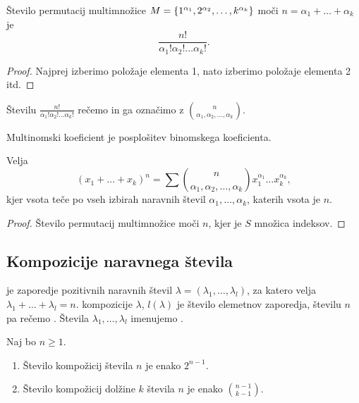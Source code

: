\begin{trditev}
    Število permutacij multimnožice $M=\left\{1^{\alpha_1}, 2^{\alpha_2}, \ldots, k^{\alpha_k}\right\}$ moči $n = \alpha_1 + \ldots + \alpha_k$ je 
    $$\frac{n!}{\alpha_1!\alpha_2!\ldots\alpha_k!}.$$
\end{trditev}

\begin{proof}
    Najprej izberimo položaje elementa 1, nato izberimo položaje elementa 2 itd.
\end{proof}

\begin{definicija}
    Številu $\frac{n!}{\alpha_1! \alpha_2! \ldots \alpha_k!}$ rečemo  in ga označimo z $\binom{n}{\alpha_1, \alpha_2, \ldots, \alpha_k}$.
\end{definicija}

\begin{opomba}
    Multinomski koeficient je posplošitev binomskega koeficienta.
\end{opomba}

\begin{trditev}
    Velja 
    $$(x_1 + \ldots + x_k)^n = \sum \binom{n}{\alpha_1, \alpha_2, \ldots, \alpha_k}x_1^{\alpha_1} \ldots x_k^{\alpha_k},$$
    kjer vsota teče po vseh izbirah naravnih števil $\alpha_1, \ldots, \alpha_k$, katerih vsota je $n$.
\end{trditev}

\begin{proof}
    Število permutacij multimnožice moči $n$, kjer je $S$ množica indeksov.
\end{proof}

\subsection{Kompozicije naravnega števila}
\begin{definicija}
     je zaporedje pozitivnih naravnih števil $\lambda = (\lambda_1, \ldots, \lambda_l)$, za katero velja $\lambda_1 + \ldots + \lambda_l = n$.  kompozicije $\lambda$, $l(\lambda)$ je število elemetnov zaporedja, številu $n$ pa rečemo . Števila $\lambda_1, \ldots, \lambda_l$ imenujemo .
\end{definicija}

\begin{trditev}
    Naj bo $n \geq 1$.
    \begin{enumerate}
        \item Število kompožicij števila $n$ je enako $2^{n-1}$.
        \item Število kompožicij dolžine $k$ števila $n$ je enako $\binom{n-1}{k-1}$.
    \end{enumerate}
\end{trditev}

